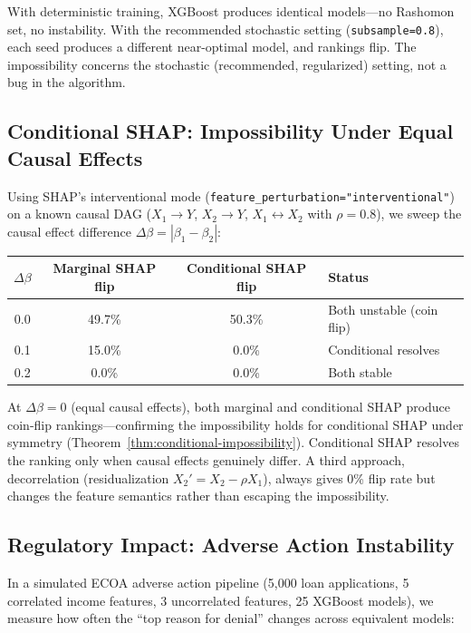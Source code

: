 \documentclass{jmlr}
\begin{document}
With deterministic training, XGBoost produces identical models---no Rashomon set, no instability.
With the recommended stochastic setting (\texttt{subsample=0.8}), each seed produces a different near-optimal model, and rankings flip.
The impossibility concerns the stochastic (recommended, regularized) setting, not a bug in the algorithm.

\subsection{Conditional SHAP: Impossibility Under Equal Causal Effects}
\label{sec:conditional-experiment}

Using SHAP's interventional mode (\texttt{feature\_perturbation="interventional"}) on a known causal DAG ($X_1 \to Y$, $X_2 \to Y$, $X_1 \leftrightarrow X_2$ with $\rho{=}0.8$), we sweep the causal effect difference $\Delta\beta = |\beta_1 - \beta_2|$:

\begin{center}
\small
\begin{tabular}{@{}cccl@{}}
\toprule
$\Delta\beta$ & Marginal SHAP flip & Conditional SHAP flip & Status \\
\midrule
0.0 & 49.7\% & 50.3\% & Both unstable (coin flip) \\
0.1 & 15.0\% & 0.0\% & Conditional resolves \\
0.2 & 0.0\% & 0.0\% & Both stable \\
\bottomrule
\end{tabular}
\end{center}

At $\Delta\beta = 0$ (equal causal effects), both marginal and conditional SHAP produce coin-flip rankings---confirming the impossibility holds for conditional SHAP under symmetry (Theorem~\ref{thm:conditional-impossibility}). Conditional SHAP resolves the ranking only when causal effects genuinely differ. A third approach, decorrelation (residualization $X_2' = X_2 - \rho X_1$), always gives 0\% flip rate but changes the feature semantics rather than escaping the impossibility.

\subsection{Regulatory Impact: Adverse Action Instability}
\label{sec:regulatory-experiment}

In a simulated ECOA adverse action pipeline (5,000 loan applications, 5 correlated income features, 3 uncorrelated features, 25 XGBoost models), we measure how often the ``top reason for denial'' changes across equivalent models:
\end{document}
